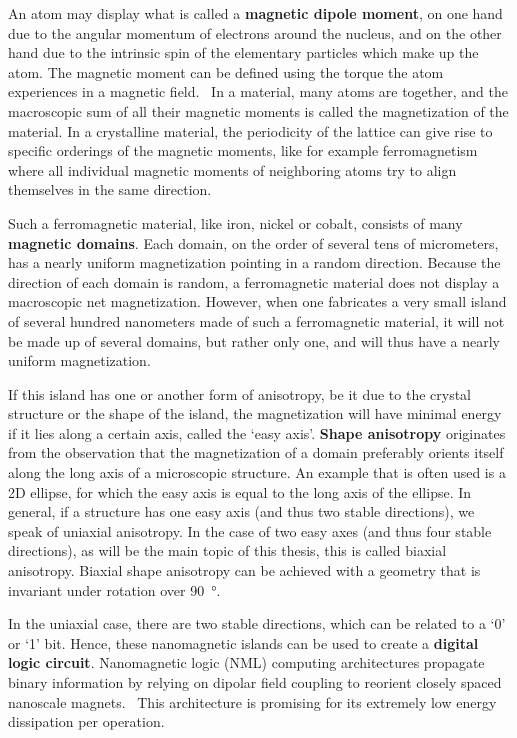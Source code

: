 \documentclass[11pt,a4paper,english]{article}
\begin{document}
\noindent An atom may display what is called a \textbf{magnetic dipole moment}, on one hand due to the angular momentum of electrons around the nucleus, and on the other hand due to the intrinsic spin of the elementary particles which make up the atom. The magnetic moment can be defined using the torque the atom experiences in a magnetic field.~\cite{IntroMagneticMaterials} In a material, many atoms are together, and the macroscopic sum of all their magnetic moments is called the magnetization of the material. In a crystalline material, the periodicity of the lattice can give rise to specific orderings of the magnetic moments, like for example ferromagnetism where all individual magnetic moments of neighboring atoms try to align themselves in the same direction. \par 
Such a ferromagnetic material, like iron, nickel or cobalt, consists of many \textbf{magnetic domains}. Each domain, on the order of several tens of micrometers, has a nearly uniform magnetization pointing in a random direction. Because the direction of each domain is random, a ferromagnetic material does not display a macroscopic net magnetization. However, when one fabricates a very small island of several hundred nanometers made of such a ferromagnetic material, it will not be made up of several domains, but rather only one, and will thus have a nearly uniform magnetization. \par
If this island has one or another form of anisotropy, be it due to the crystal structure or the shape of the island, the magnetization will have minimal energy if it lies along a certain axis, called the `easy axis'. \textbf{Shape anisotropy} originates from the observation that the magnetization of a domain preferably orients itself along the long axis of a microscopic structure. An example that is often used is a 2D ellipse, for which the easy axis is equal to the long axis of the ellipse. In general, if a structure has one easy axis (and thus two stable directions), we speak of uniaxial anisotropy. In the case of two easy axes (and thus four stable directions), as will be the main topic of this thesis, this is called biaxial anisotropy. Biaxial shape anisotropy can be achieved with a geometry that is invariant under rotation over \SI{90}{\degree}. \par
In the uniaxial case, there are two stable directions, which can be related to a `0' or `1' bit. Hence, these nanomagnetic islands can be used to create a \textbf{digital logic circuit}. Nanomagnetic logic (NML) computing architectures propagate binary information by relying on dipolar field coupling to reorient closely spaced nanoscale magnets.~\cite{SubnanosecondPropagation_AnisotropyChains} This architecture is promising for its extremely low energy dissipation per operation.~\cite{SubnanosecondPropagation_AnisotropyChains,FourStateLogic,MQCA_RoomTemp}
\end{document}
